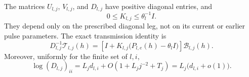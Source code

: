 \begin{lemma}
\label{lem:leg}
The matrices \(U_{l,j}\), \(V_{l,j}\), and \(D_{l,j}\) have
positive diagonal entries, and
\begin{equation}
 0\leq K_{l,j}\leq\theta_l^{-1}I.
 \label{eq:K-bound}
\end{equation}
They depend only on the prescribed diagonal leg, not on its
current or earlier pulse parameters.  The exact transmission
identity is
\begin{equation}
 D_{l,j}^{-1}\mathcal T_{l,j}(h)
 =\left[I+K_{l,j}\bigl(P_{l,e}(h)-\theta_lI\bigr)\right]
       \mathcal B_{l,j}(h).
 \label{eq:full-normalization}
\end{equation}
Moreover, uniformly for the finite set of \(l,i\),
\begin{equation}
 \log (D_{l,j})_{ii}
 =L_jd_{l,i}+O(1+L_jj^{-2}+T_j)
 =L_j\bigl(d_{l,i}+o(1)\bigr).
 \label{eq:diagonal-growth}
\end{equation}
\end{lemma}

